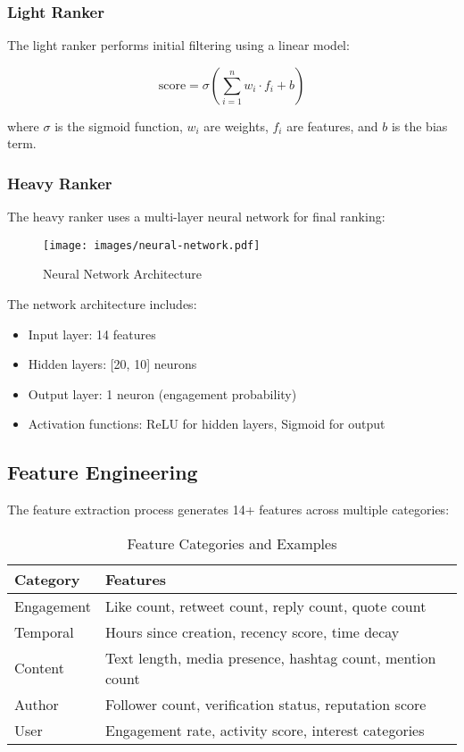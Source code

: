 \documentclass[11pt,a4paper]{article}
\begin{document}
\subsubsection{Light Ranker}

The light ranker performs initial filtering using a linear model:

\begin{equation}
\text{score} = \sigma\left(\sum_{i=1}^{n} w_i \cdot f_i + b\right)
\end{equation}

where $\sigma$ is the sigmoid function, $w_i$ are weights, $f_i$ are features, and $b$ is the bias term.

\subsubsection{Heavy Ranker}

The heavy ranker uses a multi-layer neural network for final ranking:

\begin{figure}[H]
    \centering
    \texttt{[image: images/neural-network.pdf]}
    \caption{Neural Network Architecture}
    \label{fig:neural-network}
\end{figure}

The network architecture includes:
\begin{itemize}
    \item Input layer: 14 features
    \item Hidden layers: [20, 10] neurons
    \item Output layer: 1 neuron (engagement probability)
    \item Activation functions: ReLU for hidden layers, Sigmoid for output
\end{itemize}

\subsection{Feature Engineering}

The feature extraction process generates 14+ features across multiple categories:

\begin{table}[H]
\centering
\caption{Feature Categories and Examples}
\begin{tabular}{@{}ll@{}}
\toprule
\textbf{Category} & \textbf{Features} \\
\midrule
Engagement & Like count, retweet count, reply count, quote count \\
Temporal & Hours since creation, recency score, time decay \\
Content & Text length, media presence, hashtag count, mention count \\
Author & Follower count, verification status, reputation score \\
User & Engagement rate, activity score, interest categories \\
\bottomrule
\end{tabular}
\label{tab:features}
\end{table}
\end{document}
